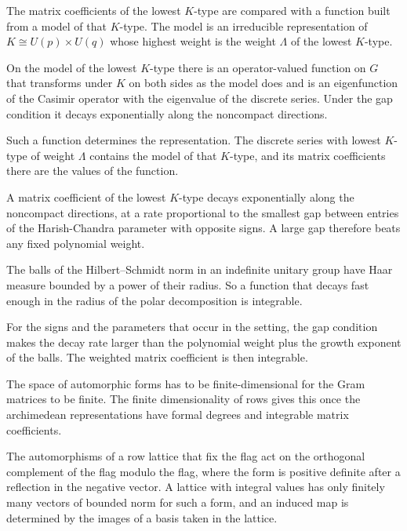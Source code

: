 The matrix coefficients of the lowest $K$-type are compared with a function built from a model of
that $K$-type. The model is an irreducible representation of $K\cong U(p)\times U(q)$ whose highest
weight is the weight $\Lambda$ of the lowest $K$-type.

On the model of the lowest $K$-type there is an operator-valued function on $G$ that transforms
under $K$ on both sides as the model does and is an eigenfunction of the Casimir operator with the
eigenvalue of the discrete series. Under the gap condition it decays exponentially along the
noncompact directions.

Such a function determines the representation. The discrete series with lowest $K$-type of weight
$\Lambda$ contains the model of that $K$-type, and its matrix coefficients there are the values of
the function.

A matrix coefficient of the lowest $K$-type decays exponentially along the noncompact directions,
at a rate proportional to the smallest gap between entries of the Harish-Chandra parameter with
opposite signs. A large gap therefore beats any fixed polynomial weight.

The balls of the Hilbert--Schmidt norm in an indefinite unitary group have Haar measure bounded by a
power of their radius. So a function that decays fast enough in the radius of the polar
decomposition is integrable.

For the signs and the parameters that occur in the setting, the gap condition makes the decay rate
larger than the polynomial weight plus the growth exponent of the balls. The weighted matrix
coefficient is then integrable.

The space of automorphic forms has to be finite-dimensional for the Gram
matrices to be finite. The finite dimensionality of rows gives this once the
archimedean representations have formal degrees and integrable matrix
coefficients.

The automorphisms of a row lattice that fix the flag act on the orthogonal complement of the flag
modulo the flag, where the form is positive definite after a reflection in the negative vector. A
lattice with integral values has only finitely many vectors of bounded norm for such a form, and an
induced map is determined by the images of a basis taken in the lattice.

